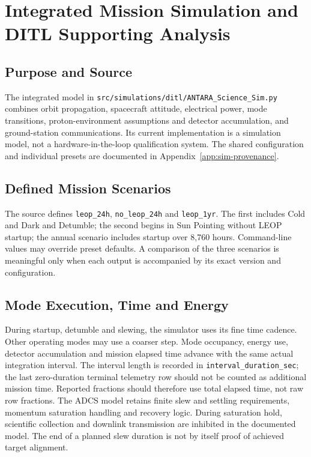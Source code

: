 
\section{Integrated Mission Simulation and DITL Supporting Analysis}\label{app:ditl-detail}
\subsection{Purpose and Source}\label{app:ditl-source}
The integrated model in \texttt{src/simulations/ditl/ANTARA\_Science\_Sim.py} combines orbit propagation, spacecraft attitude, electrical power, mode transitions, proton-environment assumptions and detector accumulation, and ground-station communications. Its current implementation is a simulation model, not a hardware-in-the-loop qualification system. The shared configuration and individual presets are documented in Appendix~\ref{app:sim-provenance}.
\subsection{Defined Mission Scenarios}\label{app:ditl-preset-details}
The source defines \texttt{leop\_24h}, \texttt{no\_leop\_24h} and \texttt{leop\_1yr}. The first includes Cold and Dark and Detumble; the second begins in Sun Pointing without LEOP startup; the annual scenario includes startup over 8,760 hours. Command-line values may override preset defaults. A comparison of the three scenarios is meaningful only when each output is accompanied by its exact version and configuration.
\subsection{Mode Execution, Time and Energy}\label{app:ditl-accounting}
During startup, detumble and slewing, the simulator uses its fine time cadence. Other operating modes may use a coarser step. Mode occupancy, energy use, detector accumulation and mission elapsed time advance with the same actual integration interval. The interval length is recorded in \texttt{interval\_duration\_sec}; the last zero-duration terminal telemetry row should not be counted as additional mission time. Reported fractions should therefore use total elapsed time, not raw row fractions.
The ADCS model retains finite slew and settling requirements, momentum saturation handling and recovery logic. During saturation hold, scientific collection and downlink transmission are inhibited in the documented model. The end of a planned slew duration is not by itself proof of achieved target alignment.
